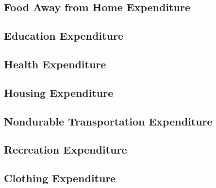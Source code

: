 \documentclass[a4paper,landscape]{article}
\begin{document}
\subsection{Food Away from Home Expenditure}

\clearpage

\subsection{Education Expenditure}

\clearpage

\subsection{Health Expenditure}

\clearpage

\subsection{Housing Expenditure}

\clearpage

\subsection{Nondurable Transportation Expenditure}

\clearpage

\subsection{Recreation Expenditure}

\clearpage

\subsection{Clothing Expenditure}

\clearpage
\end{document}

